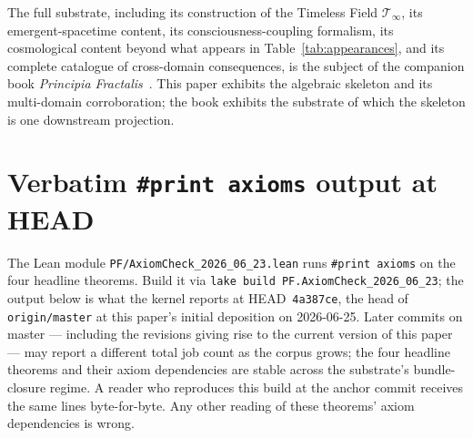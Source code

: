\documentclass[11pt,a4paper]{amsart}
\theoremstyle{plain}
\theoremstyle{definition}
\begin{document}
The full substrate, including its construction of the Timeless Field $\mathcal{T}_\infty$, its emergent-spacetime content, its consciousness-coupling formalism, its cosmological content beyond what appears in Table~\ref{tab:appearances}, and its complete catalogue of cross-domain consequences, is the subject of the companion book \emph{Principia Fractalis}~\cite{cohen2026book}. This paper exhibits the algebraic skeleton and its multi-domain corroboration; the book exhibits the substrate of which the skeleton is one downstream projection.

\appendix

\section{Verbatim \texttt{\#print axioms} output at HEAD}\label{app:axioms}

The Lean module \texttt{PF/AxiomCheck\_2026\_06\_23.lean} runs \texttt{\#print axioms} on the four headline theorems. Build it via \texttt{lake build PF.AxiomCheck\_2026\_06\_23}; the output below is what the kernel reports at HEAD~\texttt{4a387ce}, the head of \texttt{origin/master} at this paper's initial deposition on 2026-06-25. Later commits on master --- including the revisions giving rise to the current version of this paper --- may report a different total job count as the corpus grows; the four headline theorems and their axiom dependencies are stable across the substrate's bundle-closure regime. A reader who reproduces this build at the anchor commit receives the same lines byte-for-byte. Any other reading of these theorems' axiom dependencies is wrong.
\end{document}
